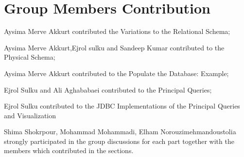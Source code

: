 \documentclass{article}
\begin{document}
\maketitle







\section{Group Members Contribution}

        \item Aysima Merve Akkurt contributed the Variations to the Relational Schema;
        \item Aysima Merve Akkurt,Ejrol sulku and Sandeep Kumar contributed to the Physical Schema;
        \item Aysima Merve Akkurt contributed to the Populate the Database: Example;
        \item Ejrol Sulku and Ali Aghababaei contributed to the Principal Queries;
        \item Ejrol Sulku contributed to the JDBC Implementations of the Principal Queries and Visualization
         \item Shima Shokrpour, Mohammad Mohammadi, Elham Norouzimehmandoustolia strongly participated in the group discussions for each part together with the members which contributed in the sections.

        
        
\end{document}
